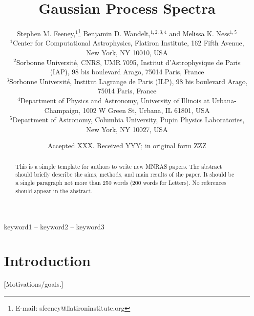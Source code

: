 \documentclass[a4paper,fleqn,usenatbib]{mnras}
\title[Gaussian Process Spectra]{Gaussian Process Spectra}
\author[S. M. Feeney et al.]{
Stephen M. Feeney,$^{1}$\thanks{E-mail: sfeeney@flatironinstitute.org}
Benjamin D. Wandelt,$^{1,2,3,4}$
and Melissa K. Ness$^{1,5}$
\\
$^{1}$Center for Computational Astrophysics, Flatiron Institute, 162 Fifth Avenue, New York, NY 10010, USA\\
$^{2}$Sorbonne Universit\'e, CNRS, UMR 7095,  Institut d'Astrophysique de Paris (IAP), 98 bis boulevard Arago, 75014 Paris, France\\
$^{3}$Sorbonne Universit\'e, Institut Lagrange de Paris (ILP), 98 bis boulevard Arago, 75014 Paris, France\\
$^{4}$Department of Physics and Astronomy, University of Illinois at Urbana-Champaign, 1002 W Green St, Urbana, IL 61801, USA\\
$^{5}$Department of Astronomy, Columbia University, Pupin Physics Laboratories, New York, NY 10027, USA
}
\date{Accepted XXX. Received YYY; in original form ZZZ}
\begin{document}
\label{firstpage}
\pagerange{\pageref{firstpage}--\pageref{lastpage}}
\maketitle

\begin{abstract}
This is a simple template for authors to write new MNRAS papers.
The abstract should briefly describe the aims, methods, and main results of the paper.
It should be a single paragraph not more than 250 words (200 words for Letters).
No references should appear in the abstract.
\end{abstract}

\begin{keywords}
keyword1 -- keyword2 -- keyword3
\end{keywords}


\section{Introduction}

[Motivations/goals.] 
\end{document}
